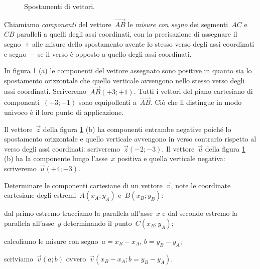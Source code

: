 \begin{figure}[htb]
\centering

\caption{Spostamenti di vettori.}\label{fig:F.4}
\end{figure}

\begin{definizione}
Chiamiamo \emph{componenti} del vettore~$\overrightarrow{AB}$ le \emph{misure con segno} dei segmenti~$AC$ e~$CB$ paralleli a quelli degli assi coordinati, con la precisazione di assegnare il segno~$+$ alle misure
dello spostamento avente lo stesso verso degli assi coordinati e segno~$-$ se il verso è opposto a quello degli assi coordinati.
\end{definizione}

In figura \ref{fig:F.4} (a) le componenti del vettore assegnato sono positive in quanto sia lo spostamento orizzontale che quello verticale avvengono nello stesso
verso degli assi coordinati. Scriveremo~$\overrightarrow{AB}(+3;+1)$. Tutti i vettori del piano cartesiano di componenti~$(+3;+1)$ sono equipollenti a~$\overrightarrow{AB}$.
Ciò che li distingue in modo univoco è il loro punto di applicazione.

\begin{exrig}
\begin{esempio}
Il vettore~$\vec{z}$ della figura \ref{fig:F.4} (b) ha componenti entrambe negative poiché lo spostamento orizzontale e quello verticale avvengono in verso
contrario rispetto al verso degli assi coordinati: scriveremo~$\vec{z}(-2;-3)$. Il vettore~$\vec{u}$ della figura \ref{fig:F.4} (b) ha la componente
lungo l'asse~$x$ positiva e quella verticale negativa: scriveremo~$\vec{u}(+4;-3)$.
\end{esempio}
\end{exrig}

\begin{procedura}
Determinare le componenti cartesiane di un vettore~$\vec{v}$, note le coordinate cartesiane degli estremi~$A(x_A;y_A)$ e~$B(x_B;y_B)$:
\begin{enumeratea}
\item dal primo estremo tracciamo la parallela all'asse~$x$ e dal secondo estremo la parallela all'asse~$y$ determinando il punto~$C(x_B;y_A)$;
\item calcoliamo le misure con segno~$a=x_B-x_A$, $b=y_B-y_A$;
\item scriviamo~$\vec{v}(a;b)$ ovvero~$\vec{v}(x_B-x_A;b=y_B-y_A)$.
\end{enumeratea}
\end{procedura}

